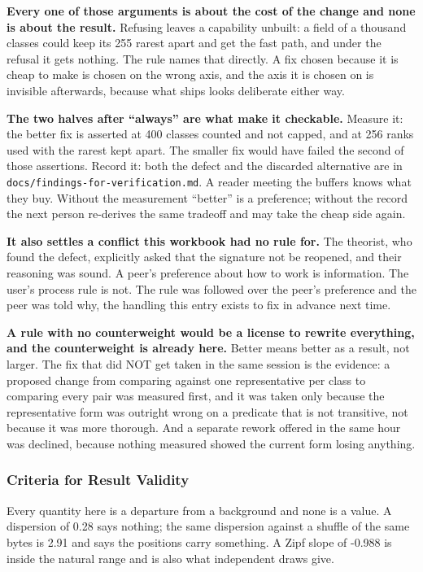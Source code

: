 \textbf{Every one of those arguments is about the cost of the change and none is about the result.} Refusing leaves a capability unbuilt: a field of a thousand classes could keep its 255 rarest apart and get the fast path, and under the refusal it gets nothing. The rule names that directly. A fix chosen because it is cheap to make is chosen on the wrong axis, and the axis it is chosen on is invisible afterwards, because what ships looks deliberate either way.

\textbf{The two halves after ``always'' are what make it checkable.} Measure it: the better fix is asserted at 400 classes counted and not capped, and at 256 ranks used with the rarest kept apart. The smaller fix would have failed the second of those assertions. Record it: both the defect and the discarded alternative are in \texttt{docs/\allowbreak{}findings-for-verification.md}. A reader meeting the buffers knows what they buy. Without the measurement ``better'' is a preference; without the record the next person re-derives the same tradeoff and may take the cheap side again.

\textbf{It also settles a conflict this workbook had no rule for.} The theorist, who found the defect, explicitly asked that the signature not be reopened, and their reasoning was sound. A peer's preference about how to work is information. The user's process rule is not. The rule was followed over the peer's preference and the peer was told why, the handling this entry exists to fix in advance next time.

\textbf{A rule with no counterweight would be a license to rewrite everything, and the counterweight is already here.} Better means better as a result, not larger. The fix that did NOT get taken in the same session is the evidence: a proposed change from comparing against one representative per class to comparing every pair was measured first, and it was taken only because the representative form was outright wrong on a predicate that is not transitive, not because it was more thorough. And a separate rework offered in the same hour was declined, because nothing measured showed the current form losing anything.

\subsubsection{Criteria for Result Validity}

Every quantity here is a departure from a background and none is a value. A dispersion of 0.28 says nothing; the same dispersion against a shuffle of the same bytes is 2.91 and says the positions carry something. A Zipf slope of -0.988 is inside the natural range and is also what independent draws give.

